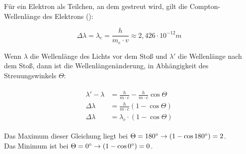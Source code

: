 Für ein Elektron als Teilchen, an dem gestreut wird, gilt die Compton-Wellenlänge des Elektrons ():

\begin{equation}
	\Delta \lambda = \lambda_c = \frac{h}{m_e \cdot v} \approx 2,426 \cdot 10^{-12}m
\end{equation}

Wenn $\lambda$ die Wellenlänge des Lichts vor dem Stoß und $\lambda'$ die Wellenlänge nach dem Stoß, dann ist die Wellenlängenänderung, in Abhängigkeit des Streuungswinkels $\Theta$:

\begin{align}
\begin{split}
	\lambda' - \lambda &= \frac{h}{m \cdot c}-\frac{h}{m \cdot c} \cos{\Theta} \\
	\Delta\lambda &= \frac{h}{m \cdot c}(1-\cos{\Theta}) \\
	\Delta\lambda &= \lambda_c \cdot (1-\cos{\Theta})
\end{split}
\end{align}


\noindent Das Maximum dieser Gleichung liegt bei $\Theta = 180\degree \rightarrow (1-\cos{180\degree})=2$. \\
Das Minimum ist bei $\Theta = 0\degree \rightarrow (1-\cos{0\degree})=0$.
